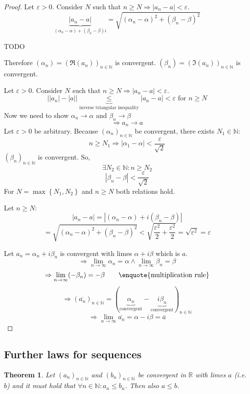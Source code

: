 \documentclass[a4paper,landscape,twocolumn]{article}
\newtheorem{theorem}{Theorem}
\newcommand\set[1]{\left\{#1\right\}}
\newcommand\abs[1]{\left|#1\right|}
\newcommand\seq[1]{{\left(#1\right)}_{n \in \mathbb N}}
\begin{document}
\begin{proof}
  Let $\varepsilon > 0$. Consider $N$ such that $n \geq N \Rightarrow \abs{a_n - a} < \varepsilon$.
  \[ \underbrace{\abs{a_n - a}}_{(\alpha_n - \alpha) + (\beta_n - \beta)i} = \sqrt{(\alpha_n - \alpha)^2 + (\beta_n - \beta)^2} \]

  TODO

  Therefore $(\alpha_n) = \seq{\Re(a_n)}$ is convergent.
  $(\beta_n) = \seq{\Im(a_n)}$ is convergent.

  Let $\varepsilon > 0$. Consider $N$ such that $n \geq N \Rightarrow \abs{a_n - a} < \varepsilon$.
  \[
      \abs{\abs{a_n} - \abs{a}}
      \underbrace{\leq}_{\text{inverse triangular inequality}}
      \abs{a_n - a} < \varepsilon \text{ for } n \geq N
  \]
  Now we need to show $\alpha_n \rightarrow \alpha$ and $\beta_n \rightarrow \beta$
  \[ \Rightarrow a_n \rightarrow a \]
  Let $\varepsilon > 0$ be arbitrary.
  Because $\seq{\alpha_n}$ be convergent, there exists $N_1 \in \mathbb N$:
  \[ n \geq N_1 \Rightarrow \abs{\alpha_1 - \alpha} < \frac{\varepsilon}{\sqrt{2}} \]
  $\seq{\beta_n}$ is convergent. So,
  \[ \exists N_2 \in \mathbb N: n \geq N_2 \]
  \[ \abs{\beta_n - \beta} < \frac{\varepsilon}{\sqrt{2}} \]
  For $N = \max\set{N_1, N_2}$ and $n \geq N$ both relations hold.

  Let $n \geq N$:
  \[ \abs{a_n - a} = \abs{(\alpha_n - \alpha) + i (\beta_n - \beta)} \]
  \[
      = \sqrt{(\alpha_n - \alpha)^2 + (\beta_n - \beta)^2}
      < \sqrt{\frac{\varepsilon^2}{2} + \frac{\varepsilon^2}{2}}
      = \sqrt{\varepsilon^2} = \varepsilon
  \]

  Let $a_n = \alpha_n + i \beta_n$ is convergent with limes $\alpha + i \beta$ which is $a$.
  \[ \Rightarrow \lim_{n \to \infty} \alpha_n = \alpha \land \lim_{n \to \infty} \beta_n = \beta \]
  \[ \Rightarrow \lim_{n \to \infty} (-\beta_n) = -\beta \qquad\text{\enquote{multiplication rule}} \]
  \[ \Rightarrow (\overline{a_n})_{n \in \mathbb N} = (\underbrace{\alpha_n}_{\text{convergent}} - \underbrace{i \beta_n}_{\text{convergent}})_{n \in \mathbb N} \]
  \[ \Rightarrow \lim_{n \to \infty} \overline{a_n} = \alpha - i \beta = \overline{a} \]
\end{proof}

\subsection{Further laws for sequences}
%
\begin{theorem}
  Let $\seq{a_n}$ and $\seq{b_n}$ be convergent in $\mathbb R$ with limes $a$ (i.e. $b$)
  and it must hold that $\forall n \in \mathbb N: a_n \leq b_n$. Then also $a \leq b$.
\end{theorem}
\end{document}
